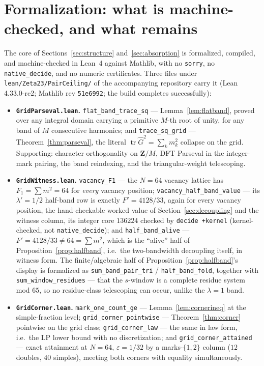 \documentclass[11pt]{article}
\theoremstyle{plain}
\theoremstyle{definition}
\theoremstyle{remark}
\newcommand{\Z}{\mathbf{Z}}
\newcommand{\Gh}{\widehat{G}}
\newcommand{\tr}{\operatorname{tr}}
\begin{document}
\section{Formalization: what is machine-checked, and what remains}
\label{sec:formalization}

The core of Sections~\ref{sec:structure} and~\ref{sec:absorption} is
formalized, compiled, and machine-checked in Lean~4 against Mathlib, with no
\texttt{sorry}, no \texttt{native\_decide}, and no numeric certificates. Three
files under \texttt{lean/Zeta23/}\allowbreak\texttt{PairCeiling/} of the
accompanying repository carry it (Lean 4.33.0-rc2; Mathlib rev
\texttt{51e6992}; the build completes successfully):

\begin{itemize}
\item \textbf{\texttt{GridParseval.lean}.} \texttt{flat\_band\_trace\_sq} ---
  Lemma~\ref{lem:flatband}, proved over any integral domain carrying a
  primitive $M$-th root of unity, for any band of $M$ consecutive harmonics; and
  \texttt{trace\_sq\_grid} --- Theorem~\ref{thm:parseval}, the literal
  $\tr \Gh^2 = \sum_k m_k^2$ collapse on the grid. Supporting: character
  orthogonality on $\Z/M$, DFT Parseval in the integer-mark pairing, the band
  reindexing, and the triangular-weight telescoping.
\item \textbf{\texttt{GridWitness.lean}.} \texttt{vacancy\_F1} --- the $N = 64$
  vacancy lattice has $F_1 = \sum m^2 = 64$ for \emph{every} vacancy position;
  \texttt{vacancy\_half\_band\_value} --- its $\lambda' = 1/2$ half-band row is
  exactly $F' = 4128/33$, again for every vacancy position, the hand-checkable
  worked value of Section~\ref{sec:decoupling} and the witness column, its
  integer core $136224$ checked by \texttt{decide +kernel} (kernel-checked, not
  \texttt{native\_decide}); and \texttt{half\_band\_alive} ---
  $F' = 4128/33 \ne 64 = \sum m^2$, which is the ``alive'' half of
  Proposition~\ref{prop:halfband}, i.e.\ the two-bandwidth decoupling itself, in
  witness form. The finite/algebraic half of Proposition~\ref{prop:halfband}'s
  display is formalized as \texttt{sum\_band\_pair\_tri} /
  \texttt{half\_band\_fold}, together with \texttt{sum\_window\_residues} ---
  that the $s$-window is a complete residue system mod $65$, so no
  residue-class telescoping can occur, unlike the $\lambda = 1$ band.
\item \textbf{\texttt{GridCorner.lean}.} \texttt{mark\_one\_count\_ge} ---
  Lemma~\ref{lem:cornerineq} at the simple-fraction level;
  \texttt{grid\_corner\_pointwise} --- Theorem~\ref{thm:corner} pointwise on the
  grid class; \texttt{grid\_corner\_law} --- the same in law form, i.e.\ the LP
  lower bound with no discretization; and \texttt{grid\_corner\_attained} ---
  exact attainment at $N = 64$, $\varepsilon = 1/32$ by a marks-$\{1, 2\}$
  column ($12$ doubles, $40$ simples), meeting both corners with equality
  simultaneously.
\end{itemize}
\end{document}
